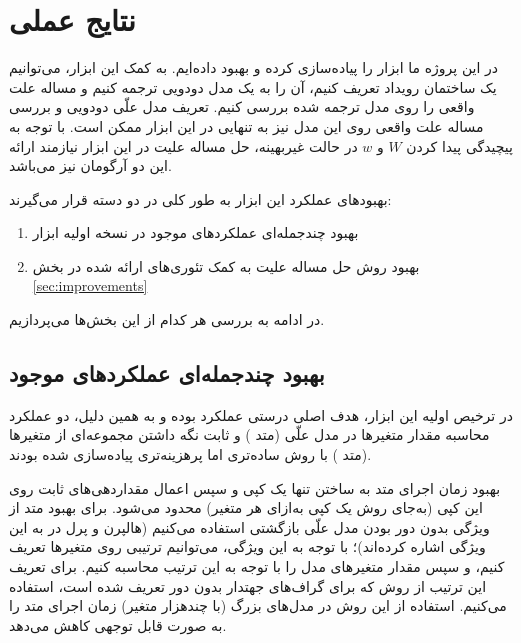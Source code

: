 \section{نتایج عملی}\label{sec:experiments}

در این پروژه ما ابزار
را پیاده‌سازی کرده و بهبود داده‌ایم.
به کمک این ابزار، می‌توانیم یک ساختمان رویداد تعریف کنیم،
آن را به یک مدل دودویی ترجمه کنیم
و مساله علت واقعی را روی مدل ترجمه شده بررسی کنیم.
تعریف مدل علّی دودویی و بررسی مساله علت واقعی 
روی این مدل نیز به تنهایی در این ابزار ممکن است.
با توجه به پیچیدگی پیدا کردن
$W$ و $w$
در حالت غیربهینه، حل مساله علیت در این ابزار
نیازمند ارائه این دو آرگومان نیز می‌باشد.

بهبودهای عملکرد این ابزار به طور کلی
در دو دسته قرار می‌گیرند:

\begin{enumerate}
  \item
    بهبود چندجمله‌ای عملکردهای موجود
    در نسخه اولیه ابزار
  \item
    بهبود روش حل مساله علیت
    به کمک تئوری‌های ارائه شده در بخش
    \ref{sec:improvements}
\end{enumerate}

در ادامه به بررسی هر کدام از این بخش‌ها می‌پردازیم.

\subsection{بهبود چندجمله‌ای عملکردهای موجود}

در ترخیص
اولیه این ابزار،
هدف اصلی درستی عملکرد بوده و به همین دلیل،
دو عملکرد محاسبه مقدار متغیرها در مدل علّی
(متد )
و ثابت نگه داشتن مجموعه‌ای از متغیرها
(متد )
با روش ساده‌تری اما پرهزینه‌تری پیاده‌سازی شده بودند.

بهبود زمان اجرای متد
به ساختن تنها یک کپی و سپس اعمال مقداردهی‌های ثابت
روی این کپی
(به‌جای روش یک کپی به‌ازای هر متغیر)
محدود می‌شود.
برای بهبود متد
از ویژگی بدون دور بودن مدل علّی بازگشتی استفاده می‌کنیم
(هالپرن و پرل در
\cite{halpern2001causes}
به این ویژگی اشاره کرده‌اند)؛
با توجه به این ویژگی، می‌توانیم ترتیبی روی متغیرها
تعریف کنیم، و سپس مقدار متغیرهای مدل را
با توجه به این ترتیب محاسبه کنیم.
برای تعریف این ترتیب از روش
که برای گراف‌های جهتدار بدون دور تعریف شده است، استفاده می‌کنیم.
استفاده از این روش در مدل‌های بزرگ
(با چندهزار متغیر)
زمان اجرای متد
را به صورت قابل توجهی کاهش می‌دهد.

